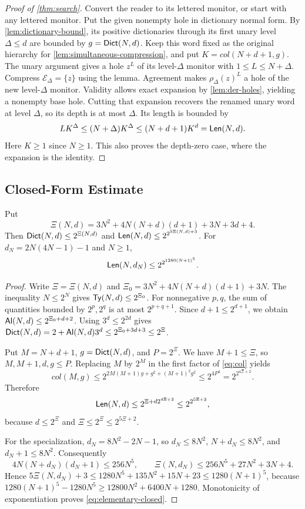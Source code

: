 \begin{proof}[Proof of \cref{thm:search}]
Convert the reader to its lettered monitor, or start with any lettered
monitor. Put the given nonempty hole in dictionary normal form. By
\cref{lem:dictionary-bound}, its positive dictionaries through its first
unary level $\Delta\le d$ are bounded by $g=\mathsf{Dict}(N,d)$. Keep this word
fixed as the original hierarchy for \cref{lem:simultaneous-compression}, and put
$K=\mathit{col}(N+d+1,g)$.
The unary argument gives a hole $z^L$ of its level-$\Delta$ monitor with
$1\le L\le N+\Delta$. Compress $\mathcal E_\Delta=\{z\}$ using the lemma. Agreement makes
$\rho_\Delta(z)^L$ a hole of the new level-$\Delta$ monitor. Validity allows exact
expansion by \cref{lem:der-holes}, yielding a nonempty base hole.
Cutting that expansion recovers the renamed unary word at level $\Delta$,
so its depth is at most $\Delta$. Its length is bounded by
\[
 LK^\Delta\le(N+\Delta)K^\Delta\le(N+d+1)K^d=\mathsf{Len}(N,d).
\]
Here $K\ge1$ since $N\ge1$. This also proves the depth-zero case,
where the expansion is the identity.
\end{proof}

\subsection{Closed-Form Estimate}
\begin{lemma}\label{lem:elementary-estimate}
Put
\[
 \Xi(N,d)=3N^2+4N(N+d)(d+1)+3N+3d+4.
\]
Then $\mathsf{Dict}(N,d)\le2^{\Xi(N,d)}$ and
$\mathsf{Len}(N,d)\le2^{2^{5\Xi(N,d)+3}}$.
For $d_N=2N(4N-1)-1$ and $N\ge1$,
\begin{equation}\label{eq:elementary-closed}
 \mathsf{Len}(N,d_N)\le2^{2^{1280(N+1)^5}}.
\end{equation}
\end{lemma}
\begin{proof}
Write $\Xi=\Xi(N,d)$ and
$\Xi_0=3N^2+4N(N+d)(d+1)+3N$.
The inequality $N\le2^N$ gives
$\mathsf{Ty}(N,d)\le2^{\Xi_0}$. For nonnegative $p,q$, the sum of quantities
bounded by $2^p,2^q$ is at most $2^{p+q+1}$. Since
$d+1\le2^{d+1}$, we obtain $\mathsf{Al}(N,d)\le2^{\Xi_0+d+2}$.
Using $3^d\le2^{2d}$ gives
$\mathsf{Dict}(N,d)=2+\mathsf{Al}(N,d)3^d\le2^{\Xi_0+3d+3}\le2^\Xi$.

Put $M=N+d+1$, $g=\mathsf{Dict}(N,d)$, and $P=2^\Xi$. We have $M+1\le \Xi$,
so $M,M+1,d,g\le P$. Replacing $M$ by $2^M$ in the first factor
of \eqref{eq:col} yields
\[
 \mathit{col}(M,g)
 \le2^{2M(M+1)g+g^2+(M+1)^2g^2}
 \le2^{4P^4}=2^{2^{4\Xi+2}}.
\]
Therefore
\[
 \mathsf{Len}(N,d)\le2^{\Xi+d2^{4\Xi+2}}
 \le2^{2^{5\Xi+3}},
\]
because $d\le2^\Xi$ and $\Xi\le2^\Xi\le2^{5\Xi+2}$.

For the specialization, $d_N=8N^2-2N-1$, so $d_N\le8N^2$, $N+d_N\le8N^2$, and
$d_N+1\le8N^2$. Consequently
\[
 4N(N+d_N)(d_N+1)\le256N^5,
 \qquad \Xi(N,d_N)\le256N^5+27N^2+3N+4.
\]
Hence $5\Xi(N,d_N)+3\le1280N^5+135N^2+15N+23\le1280(N+1)^5$, because
$1280(N+1)^5-1280N^5\ge12800N^2+6400N+1280$.
Monotonicity of exponentiation proves \eqref{eq:elementary-closed}.
\end{proof}
